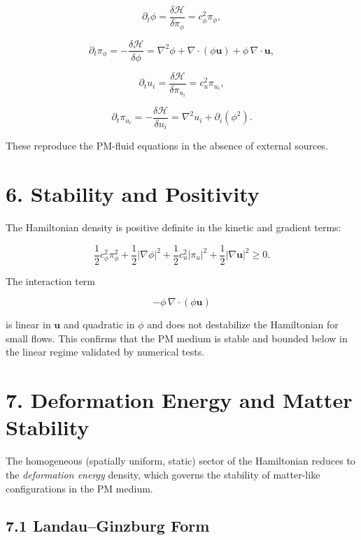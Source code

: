 \documentclass{article}
\begin{document}
\[
\partial_t \phi = \frac{\delta \mathcal{H}}{\delta \pi_\phi}
= c_\phi^2 \pi_\phi,
\]





\[
\partial_t \pi_\phi = -\frac{\delta \mathcal{H}}{\delta \phi}
= \nabla^2 \phi + \nabla\cdot(\phi\mathbf u) + \phi\,\nabla\cdot\mathbf u,
\]





\[
\partial_t u_i = \frac{\delta \mathcal{H}}{\delta \pi_{u_i}}
= c_u^2 \pi_{u_i},
\]





\[
\partial_t \pi_{u_i} = -\frac{\delta \mathcal{H}}{\delta u_i}
= \nabla^2 u_i + \partial_i(\phi^2).
\]



These reproduce the PM-fluid equations in the absence of external sources.

\section*{6. Stability and Positivity}

The Hamiltonian density is positive definite in the kinetic and gradient terms:


\[
\frac{1}{2}c_\phi^2 \pi_\phi^2
+ \frac{1}{2}|\nabla \phi|^2
+
\frac{1}{2}c_u^2 |\pi_u|^2
+ \frac{1}{2}|\nabla \mathbf u|^2 \ge 0.
\]



The interaction term


\[
-\phi\,\nabla\cdot(\phi\mathbf u)
\]


is linear in $\mathbf u$ and quadratic in $\phi$ and does not destabilize the Hamiltonian for small flows. This confirms that the PM medium is stable and bounded below in the linear regime validated by numerical tests.

\section*{7. Deformation Energy and Matter Stability}

The homogeneous (spatially uniform, static) sector of the Hamiltonian reduces
to the \emph{deformation energy} density, which governs the stability of
matter-like configurations in the PM medium.

\subsection*{7.1 Landau--Ginzburg Form}
\end{document}
